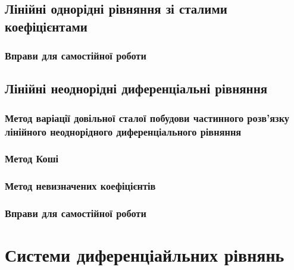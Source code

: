 \documentclass[a4paper, 12pt]{article}
\theoremstyle{definition}
\numberwithin{equation}{section}%
\numberwithin{equation}{subsection}
\begin{document}


\subsection{Лінійні однорідні рівняння зі сталими коефіцієнтами}



\subsubsection{Вправи для самостійної роботи}



\subsection{Лінійні неоднорідні диференціальні рівняння}



\subsubsection{Метод варіації довільної сталої побудови частинного роз\-в'яз\-ку лінійного неоднорідного диференціального рівняння}



\subsubsection{Метод Коші}



\subsubsection{Метод невизначених коефіцієнтів}



\subsubsection{Вправи для самостійної роботи}



\section{Системи диференціайльних рівнянь}
\end{document}

